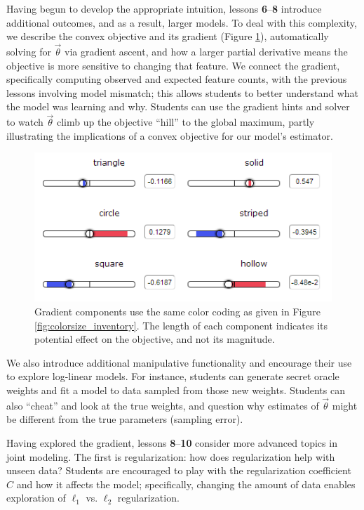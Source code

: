 \documentclass[11pt,letterpaper]{article}
\begin{document}
Having begun to develop the appropriate intuition, lessons \textbf{6}--\textbf{8} introduce 
additional outcomes, and as a result, larger models. To deal with this complexity, we describe the convex 
objective and its gradient 
(Figure \ref{fig:gradients}), 
automatically solving for $\vec{\theta}$ via gradient ascent, and how a larger partial derivative means the objective is more 
sensitive to changing that feature. We connect the gradient, specifically computing observed and expected feature 
counts, with the previous lessons involving model mismatch; this allows students to better understand what the 
model was learning and why. 
Students can use the gradient hints and solver to watch $\vec{\theta}$ climb up the objective ``hill'' to the global maximum, 
partly illustrating the implications of a convex objective for our model's estimator.

\begin{figure}[t]
\centering
\small
\includegraphics[scale=.65]{images/gradient-lesson7.PNG}
\caption{Gradient components use the same color coding as given in Figure \ref{fig:colorsize_inventory}. The length of each component indicates its potential effect on the objective, and not its magnitude.}
\label{fig:gradients}
\end{figure}

We also introduce additional manipulative functionality and encourage their use to 
explore log-linear models. For instance, students can generate secret oracle weights and 
fit a model to data sampled from those new weights. Students can also ``cheat'' and look at the true 
weights,  and question why estimates of $\vec{\theta}$ might be different from the true parameters 
(sampling error).

Having explored the gradient, lessons \textbf{8}--\textbf{10} consider more advanced topics in joint 
modeling. The first is regularization: how does regularization help with unseen data? Students are encouraged 
to play with the regularization coefficient $C$ and how it affects the model; specifically, changing the amount 
of data enables exploration of $\ell_1$ vs. $\ell_2$ regularization.
\end{document}
